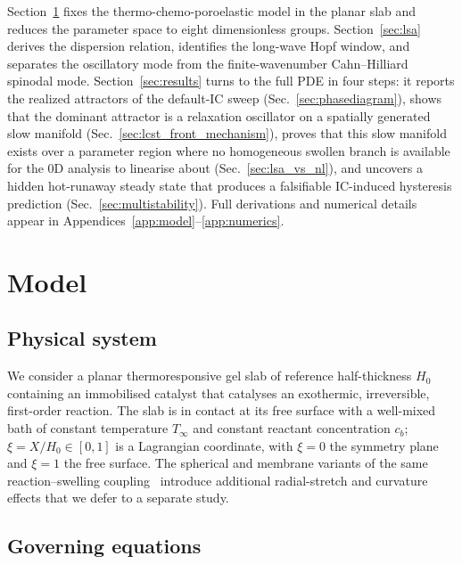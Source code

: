 \documentclass[aps,pre,reprint,superscriptaddress,longbibliography,floatfix]{revtex4-2}
\begin{document}
Section~\ref{sec:model} fixes the thermo-chemo-poroelastic model in
the planar slab and reduces the parameter space to eight dimensionless
groups. Section~\ref{sec:lsa} derives the dispersion relation, identifies
the long-wave Hopf window, and separates the oscillatory mode from
the finite-wavenumber Cahn--Hilliard spinodal mode. Section~\ref{sec:results}
turns to the full PDE in four steps: it reports the realized
attractors of the default-IC sweep
(Sec.~\ref{sec:phasediagram}), shows that the dominant attractor is a
relaxation oscillator on a spatially generated slow manifold
(Sec.~\ref{sec:lcst_front_mechanism}), proves that this slow manifold
exists over a parameter region where no homogeneous swollen branch is
available for the 0D analysis to linearise about
(Sec.~\ref{sec:lsa_vs_nl}), and uncovers a hidden hot-runaway steady
state that produces a falsifiable IC-induced hysteresis prediction
(Sec.~\ref{sec:multistability}). Full derivations and numerical
details appear in Appendices~\ref{app:model}--\ref{app:numerics}.


\section{Model}
\label{sec:model}

\subsection{Physical system}

We consider a planar thermoresponsive gel slab of reference
half-thickness $H_0$ containing an immobilised catalyst that catalyses
an exothermic, irreversible, first-order reaction. The slab is
in contact at its free surface with a well-mixed bath of constant
temperature $T_\infty$ and constant reactant concentration $c_b$;
$\xi=X/H_0\in[0,1]$ is a Lagrangian coordinate, with $\xi=0$ the
symmetry plane and $\xi=1$ the free surface. The spherical and
membrane variants of the same reaction--swelling
coupling~\cite{Siegel1988,Siegel1993,Boissonade2003,BoissonadeDeKepper2011}
introduce additional radial-stretch and curvature effects that we
defer to a separate study.

\subsection{Governing equations}
\end{document}
